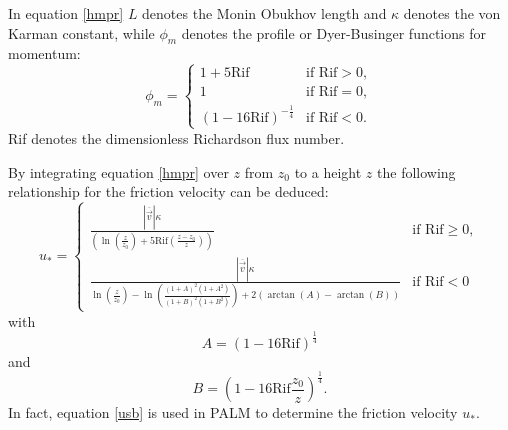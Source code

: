 \documentclass[11pt,a4paper,titlepage]{scrreprt}
\begin{document}
In equation \ref{hmpr} $L$ denotes the Monin Obukhov length and $\kappa$ denotes the von Karman constant, while $\phi_m$ denotes the profile 
or Dyer-Businger functions for momentum:
\begin{equation}
\phi_m = 
\begin{cases}
1+5 \text{Rif} & \text{if $\text{Rif} > 0$}, \\
1 & \text{if $\text{Rif} = 0$}, \\
\left ( 1 - 16 \text{Rif} \right )^{-\frac{1}{4}} & \text{if $\text{Rif} < 0$}. 
\end{cases}
\end{equation} 
Rif denotes the dimensionless Richardson flux number.

By integrating equation \ref{hmpr} over $z$ from $z_0$ to a height $z$ the following relationship for the friction velocity can be deduced:    
\begin{equation} \label{usb}
u_{\ast} =
\begin{cases}
\frac{\left | \overline{\vec{v}} \right | \kappa}{\left ( \ln \left ( \frac{z}{z_0} \right ) + 5 \text{Rif} \left ( \frac{z-z_0}{z} \right ) \right )} & \text{if $\text{Rif} \ge 0$}, \\
\frac{\left | \overline{\vec{v}} \right | \kappa}{\ln \left ( \frac{z}{z_0} \right ) - \ln \left ( \frac{ \left ( 1+A \right )^2  \left ( 1+A^2 \right ) }{ \left ( 1+B \right )^2  \left ( 1+B^2 \right ) }\right ) + 2 \left ( \arctan(A) - \arctan(B) \right )} & \text{if $\text{Rif}<0$}
\end{cases} 
\end{equation}
with
\begin{equation}
A=\left ( 1 - 16 \text{Rif} \right )^{\frac{1}{4}} 
\end{equation}
and
\begin{equation}
B=\left ( 1 - 16 \text{Rif} \frac{z_0}{z} \right )^{\frac{1}{4}}.
\end{equation}
In fact, equation \ref{usb} is used in PALM to determine the friction velocity $u_{\ast}$.
\end{document}
